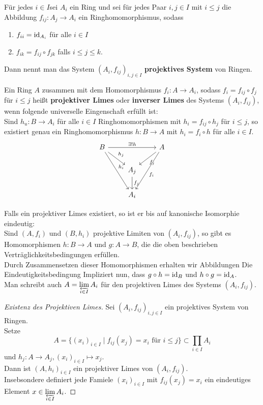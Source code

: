 	\begin{definition}
		Für jedes $i\in I $sei $A_i$ ein Ring und sei für jedes Paar $i,j\in I$ mit $i\leq j$ die Abbildung $f_{ij}:A_j\to A_i$ ein Ringhomomorphismus, sodass
		\begin{enumerate}
			\item $f_{ii}=\id_{A_i}$ für alle $i\in I$
			\item $f_{ik}=f_{ij}\circ f_{jk}$ falls $i\leq j\leq k$.
		\end{enumerate}
		Dann nennt man das System $(A_i,f_{ij})_{i,j\in I}$ \textbf{projektives System} von Ringen.
	\end{definition}

	\begin{definition}
		Ein Ring $A$ zusammen mit dem Homomorphismus $f_i:A\to A_i$, sodass $f_i=f_{ij}\circ f_{j}$ für $i\leq j$ heißt \textbf{projektiver Limes} oder \textbf{inverser Limes} des Systems $(A_i,f_{ij})$, wenn folgende universelle Eingenschaft erfüllt ist:\\
		Sind $h_u:B\to A_i$ für alle $i\in I$ Ringhomomorphismen mit $h_i=f_{ij}\circ h_j$ für $i\leq j$, so existiert genau ein Ringhomomorphismus $h:B\to A$ mit $h_i=f_i\circ h$ für alle $i\in I$.
		\[\begin{tikzcd}
		B \ar[rr,"\exists!h"] \ar[rdd,"h_i"] \ar[rd,"h_j"] && A \ar[ld,"f_j"] \ar[ldd,"f_i"]\\
		& A_j \ar[d,"f_j"]&\\
		& A_i &
		\end{tikzcd}\]
	\end{definition}

	\begin{bem}
		Falls ein projektiver Limes existiert, so ist er bis auf kanonische Isomorphie eindeutig:\\
		Sind $(A,f_i)$ und $(B,h_i)$ projektive Limiten von $(A_i,f_{ij})$, so gibt es Homomorphismen $h:B\to A$ und $g:A\to B$, die die oben beschrieben Verträglichkeitsbedingungen erfüllen.\\
		Durch Zusammensetzen dieser Homomorphismen erhalten wir Abbildungen
		Die Eindeutigkeitsbedingung Impliziert nun, dass $g\circ h=\id_B$ und $h\circ g=\id_A$.\\
		Man schreibt auch $A=\projlim{i\in I}A_i$ für den projektiven Limes des Systems $(A_i,f_{ij})$.
	\end{bem}

	\begin{proof}[Existenz des Projektiven Limes]
		Sei $(A_i,f_{ij})_{i,j\in I}$ ein projektives System von Ringen.\\
		Setze 
		\[A=\{(x_i)_{i\in I}\mid \text{$f_{ij}(x_j)=x_i$ für $i\leq j$}\}\subset\prod_{i\in I}A_i\]
		und $h_j:A\to A_j,(x_i)_{i\in I}\mapsto x_j$.\\
		Dann ist $(A,h_i)_{i\in I}$ ein projektiver Limes von $(A_i,f_{ij})$.\\
		Insebsondere definiert jede Famiele $(x_i)_{i\in I}$ mit $f_{ij}(x_j)=x_i$ ein eindeutiges Element $x\in\projlim{i\in I}A_i$.
	\end{proof}

